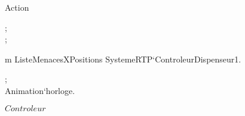 \begin{op}[e]{Action}%
\signature{() \Oto ()}
\parms{}
\begin{blockstmt}
 ; \\
 ; \\
\begin{setfor}{m}{ \Dom ListeMenacesXPositions}
SystemeRTP`ControleurDispenseur1.
\end{setfor}
\end{blockstmt}
\end{op}
\kThreadDef
\begin{thread}
\begin{blockstmt}
\begin{while}{\True }
\begin{blockstmt}
 ; \\
Animation`horloge.
\end{blockstmt}
\end{while}
\end{blockstmt}
\end{thread}
\kEnd $Controleur$

